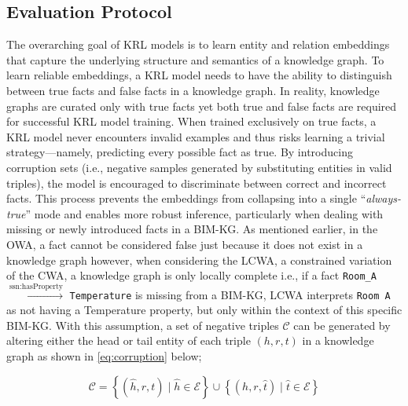 \subsection{Evaluation Protocol}

The overarching goal of \ac{KRL} models is to learn entity and relation embeddings that capture the underlying structure and semantics of a knowledge graph. To learn reliable embeddings, a \ac{KRL} model needs to have the ability to distinguish between true facts and false facts in a knowledge graph. In reality, knowledge graphs are curated only with true facts yet both true and false facts are required for successful \ac{KRL} model training. When trained exclusively on true facts, a \ac{KRL} model never encounters invalid examples and thus risks learning a trivial strategy—namely, predicting every possible fact as true. By introducing corruption sets (i.e., negative samples generated by substituting entities in valid triples), the model is encouraged to discriminate between correct and incorrect facts. This process prevents the embeddings from collapsing into a single “\textit{always-true}” mode and enables more robust inference, particularly when dealing with missing or newly introduced facts in a \ac{BIM-KG}.  As mentioned earlier, in the \ac{OWA}, a fact cannot be considered false just because it does not exist in a knowledge graph however, when considering the \ac{LCWA}, a constrained variation of the \ac{CWA}, a knowledge graph is only locally complete i.e., if a fact \texttt{Room\_A} $\xrightarrow{\text{ssn:hasProperty}}$ \texttt{Temperature} is missing from a \ac{BIM-KG}, \ac{LCWA} interprets \texttt{Room A} as not having a Temperature property, but only within the context of this specific \ac{BIM-KG}. With this assumption, a set of negative triples $\mathcal{C}$ can be generated by altering either the head or tail entity of each triple \( (h, r, t) \) in a knowledge graph as shown in \autoref{eq:corruption} below;

\begin{equation}
\label{eq:corruption}
\mathcal{C} = \left\{(\hat{h}, r, t) \mid \hat{h} \in \mathcal{E}\right\} 
\cup \left\{(h, r, \hat{t}) \mid \hat{t} \in \mathcal{E}\right\}
\end{equation}

